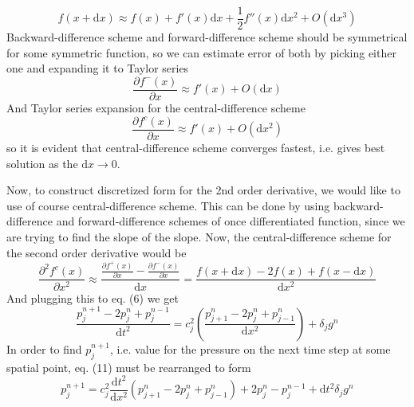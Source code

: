 \documentclass[]{article}
\begin{document}
\begin{equation}
	f\left(x+\textrm{d}x\right)\approx f\left(x\right)+f'\left(x\right)\textrm{d}x+\frac{1}{2}f''\left(x\right)\textrm{d}x^2+O\left(\textrm{d}x^3\right)
\end{equation}
Backward-difference scheme and forward-difference scheme should be symmetrical for some symmetric function, so we can estimate error of both by picking either one and expanding it to Taylor series
\begin{equation*}
	\frac{\partial f^-\left(x\right)}{\partial x}\approx f'\left(x\right)+O\left(\textrm{d}x\right)
\end{equation*}
And Taylor series expansion for the central-difference scheme
\begin{equation*}
	\frac{\partial f^c\left(x\right)}{\partial x}\approx f'\left(x\right)+O\left(\textrm{d}x^2\right)
\end{equation*}
so it is evident that central-difference scheme converges fastest, i.e. gives best solution as the $\textrm{d}x\rightarrow 0$. \par
Now, to construct discretized form for the 2nd order derivative, we would like to use of course central-difference scheme. This can be done by using backward-difference and forward-difference schemes of once differentiated function, since we are trying to find the slope of the slope. Now, the central-difference scheme for the second order derivative would be 
\begin{equation*}
	\frac{\partial^2 f^c\left(x\right)}{\partial x^2}\approx \frac{\frac{\partial f^+\left(x\right)}{\partial x}-\frac{\partial f^-\left(x\right)}{\partial x}}{\textrm{d}x}=\frac{f\left(x+\textrm{d}x\right)-2f\left(x\right)+f\left(x-\textrm{d}x\right)}{\textrm{d}x^2}
\end{equation*}
And plugging this to eq. (6) we get
\begin{equation}
	\frac{p_j^{n+1}-2p_j^n+p_j^{n-1}}{\textrm{d}t^2}=c^2_j\left(\frac{p_{j+1}^n-2p_j^n+p_{j-1}^n}{\textrm{d}x^2}\right)+\delta_j g^n
\end{equation}
In order to find $p_j^{n+1}$, i.e. value for the pressure on the next time step at some spatial point, eq. (11) must be rearranged to form
\begin{equation}
	p_j^{n+1}=c_j^2\frac{\textrm{d}t^2}{\textrm{d}x^2}\left(p^n_{j+1}-2p^n_j+p^n_{j-1}\right)+2p^n_j-p_j^{n-1}+\textrm{d}t^2\delta_j g^n	
\end{equation}

\newpage
\end{document}
